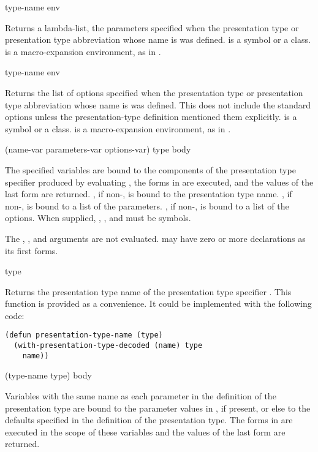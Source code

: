  {type-name \optional env}

Returns a lambda-list, the parameters specified when the presentation type or
presentation type abbreviation whose name is  was defined.
 is a symbol or a class.   is a macro-expansion
environment, as in .


 {type-name \optional env}

Returns the list of options specified when the presentation type or presentation
type abbreviation whose name is  was defined.  This does not
include the standard options unless the presentation-type definition mentioned
them explicitly.   is a symbol or a class.   is a
macro-expansion environment, as in .


 {(name-var \optional parameters-var options-var) 
                                            type
                                            \body body}

The specified variables are bound to the components of the presentation type
specifier produced by evaluating , the forms in  are
executed, and the values of the last form are returned.  , if
non-, is bound to the presentation type name.  , if
non-, is bound to a list of the parameters.  , if
non-, is bound to a list of the options.  When supplied, ,
, and  must be symbols.

The , , and  arguments are
not evaluated.   may have zero or more declarations as its first
forms. 

 {type}

Returns the presentation type name of the presentation type specifier .
This function is provided as a convenience.  It could be implemented with the
following code:

\begin{verbatim}
(defun presentation-type-name (type)
  (with-presentation-type-decoded (name) type
    name))
\end{verbatim}

 {(type-name type) \body body}

Variables with the same name as each parameter in the definition of the
presentation type are bound to the parameter values in , if present,
or else to the defaults specified in the definition of the presentation type.
The forms in  are executed in the scope of these variables and the
values of the last form are returned.

